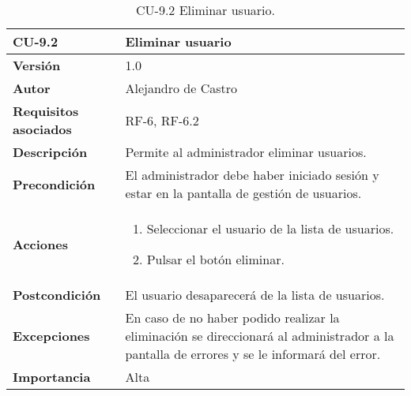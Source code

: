 \begin{table}[p]
	\centering
	\begin{tabularx}{\linewidth}{ p{} p{} }
		\toprule
		\textbf{CU-9.2}    & \textbf{Eliminar usuario}\\
		\toprule
		\textbf{Versión}              & 1.0    \\
		\textbf{Autor}                & {Alejandro de Castro} \\
		\textbf{Requisitos asociados} & RF-6, RF-6.2 \\
		\textbf{Descripción}          & Permite al administrador eliminar usuarios. \\
		\textbf{Precondición}         & El administrador debe haber iniciado sesión y estar en la pantalla de gestión de usuarios. \\
        \textbf{Acciones}             &
		\begin{enumerate}
			\def\labelenumi{\arabic{enumi}.}
			\tightlist
            \item Seleccionar el usuario de la lista de usuarios.
			\item Pulsar el botón eliminar.
		\end{enumerate}\\ 
		\textbf{Postcondición}        & El usuario desaparecerá de la lista de usuarios. \\
		\textbf{Excepciones}          & En caso de no haber podido realizar la eliminación se direccionará al administrador a la pantalla de errores y se le informará del error. \\
		\textbf{Importancia}          & Alta \\
		\bottomrule
	\end{tabularx}
	\caption{CU-9.2 Eliminar usuario.}
\end{table}

